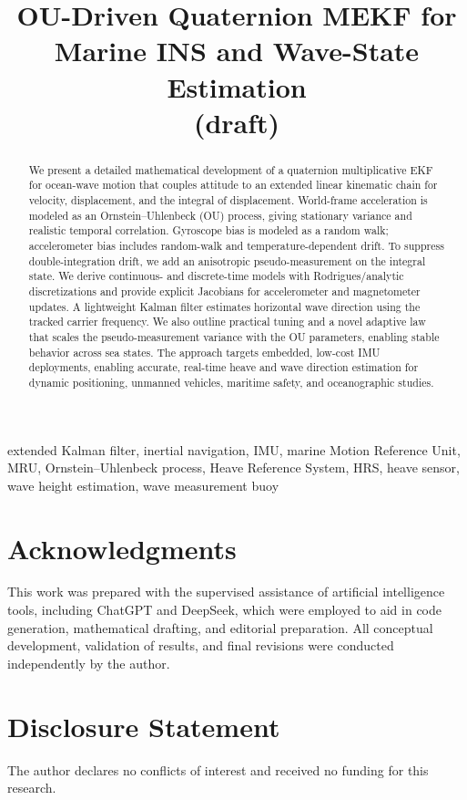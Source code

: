 \documentclass[conference]{IEEEtran}
\title{OU-Driven Quaternion MEKF for Marine INS and Wave-State Estimation\\
(draft)}
\author{%
    \IEEEauthorblockN{Mikhail S. Grushinskiy}
    \IEEEauthorblockA{Independent Researcher, USA, Fair Lawn\\
    Bareboat Necessities GitHub Project\\
    Email: mgrouch@users.github.com}%
}
\theoremstyle{bodysmall}
\theoremstyle{remark}
\begin{document}
    \maketitle

    \begin{abstract}
        We present a detailed mathematical development of a quaternion multiplicative EKF for ocean-wave motion that couples attitude to an extended
        linear kinematic chain for velocity, displacement, and the integral of displacement. World-frame acceleration is modeled as
        an Ornstein–Uhlenbeck (OU) process, giving stationary variance and realistic temporal correlation. Gyroscope bias is modeled as a random walk;
        accelerometer bias includes random-walk and temperature-dependent drift. To suppress double-integration drift, we add an anisotropic
        pseudo-measurement on the integral state. We derive continuous- and discrete-time models with Rodrigues/analytic discretizations and
        provide explicit Jacobians for accelerometer and magnetometer updates. A lightweight Kalman filter estimates horizontal wave direction
        using the tracked carrier frequency. We also outline practical tuning and a novel adaptive law that scales the pseudo-measurement
        variance with the OU parameters, enabling stable behavior across sea states. The approach targets embedded, low-cost IMU deployments, enabling accurate, real-time heave and wave direction estimation for dynamic positioning, unmanned vehicles, maritime safety, and oceanographic studies.
    \end{abstract}

    \begin{IEEEkeywords}
        extended Kalman filter, inertial navigation, IMU, marine Motion Reference Unit, MRU, Ornstein--Uhlenbeck process, Heave Reference System, HRS, heave sensor,
        wave height estimation, wave measurement buoy
    \end{IEEEkeywords}

    
    
    
    
    
    
    
    
    
    
    
    

    \FloatBarrier

    \section*{Acknowledgments}
    This work was prepared with the supervised assistance of artificial intelligence tools, including ChatGPT and DeepSeek, which were employed to aid in code generation, mathematical drafting, and editorial preparation. All conceptual development, validation of results, and final revisions were conducted independently by the author.

    \section*{Disclosure Statement}
    The author declares no conflicts of interest and received no funding for this research.

    
    

    \balance
\end{document}
